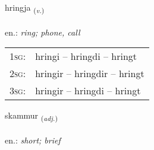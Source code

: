 \documentclass[frontgrid, backgrid]{flacards}\usepackage[]{graphicx}\usepackage[]{xcolor}
\begin{document}
\renewcommand{\flhead}{\vskip5pt \fboxsep=0pt {\small\bfseries\footnotesize Sagnorð | Verb}}
\renewcommand{\fcfoot}{\vskip5pt \fboxsep=0pt \hspace{2pt}{\small\bfseries\footnotesize 1K}}

\renewcommand{\blhead}{\vskip5pt {\small\bfseries\footnotesize Sagnorð | Verb }}
\renewcommand{\bcfoot}{\vskip5pt \hspace{2pt}{\small\bfseries\footnotesize 1K}}


{hringja \small{\textsubscript{(\textit{v.})}} \\[1ex] %
\textphonetic{[r̥iɲca]} \\
en.: \emph{ring; phone, call} \\  [2ex]
\renewcommand*{\arraystretch}{0.8}
\begin{tabular}{p{1cm}l}
\textsc{1sg}: & hringi -- hringdi -- hringt \\ 
\textsc{2sg}: & hringir -- hringdir -- hringt \\ 
\textsc{3sg}: & hringir -- hringdi -- hringt \\ 
\end{tabular}
}

\renewcommand{\flhead}{\vskip5pt \fboxsep=0pt {\small\bfseries\footnotesize Lýsingarorð | Adjective}}
\renewcommand{\fcfoot}{\vskip5pt \fboxsep=0pt \hspace{2pt}{\small\bfseries\footnotesize 1K}}

\renewcommand{\blhead}{\vskip5pt {\small\bfseries\footnotesize Lýsingarorð | Adjective }}
\renewcommand{\bcfoot}{\vskip5pt \hspace{2pt}{\small\bfseries\footnotesize 1K}}


{skammur \small{\textsubscript{(\textit{adj.})}} \\[1ex] %
\textphonetic{[skamʏr]} \\
en.: \emph{short; brief} \\  [2ex]
\renewcommand*{\arraystretch}{0.8}
}
\end{document}
